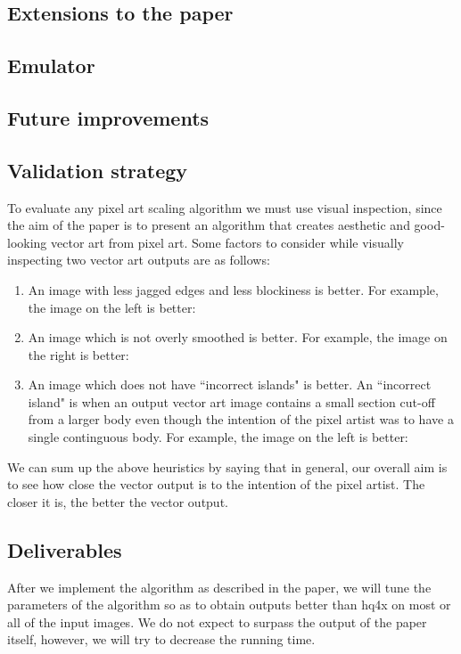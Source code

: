 \documentclass[a4paper,9pt]{article}
\begin{document}
\textcolor{myrust}{\subsection{Extensions to the paper}}

\textcolor{myrust}{\subsection{Emulator}}

\textcolor{myrust}{\subsection{Future improvements}}




\textcolor{myrust}{\section{Validation strategy}}

To evaluate any pixel art scaling algorithm we must use visual inspection, since the aim of the paper is to present an algorithm that creates aesthetic and good-looking vector art from pixel art. Some factors to consider while visually inspecting two vector art outputs are as follows:\\

\begin{enumerate}
  \itemsep-0.25em
  \item An image with less jagged edges and less blockiness is better. For example, the image on the left is better:\\
  \item An image which is not overly smoothed is better. For example, the image on the right is better:\\
  \item An image which does not have ``incorrect islands" is better. An ``incorrect island" is when an output vector art image contains a small section cut-off from a larger body even though the intention of the pixel artist was to have a single continguous body. For example, the image on the left is better:\\
\end{enumerate}

We can sum up the above heuristics by saying that in general, our overall aim is to see how close the vector output is to the intention of the pixel artist. The closer it is, the better the vector output.

\textcolor{myrust}{\section{Deliverables}}

After we implement the algorithm as described in the paper, we will tune the parameters of the algorithm so as to obtain outputs better than hq4x on most or all of the input images. We do not expect to surpass the output of the paper itself, however, we will try to decrease the running time.
\end{document}

